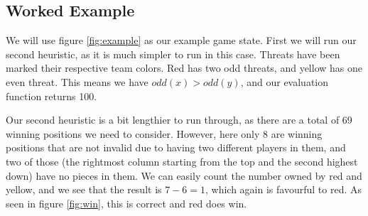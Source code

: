 \documentclass{article}
\begin{document}
\subsection{Worked Example}
We will use figure \ref{fig:example} as our example game state. First we will run our second heuristic, as it is much simpler to run in this case. Threats have been marked their respective team colors. Red has two odd threats, and yellow has one even threat. This means we have $odd(x) > odd(y)$, and our evaluation function returns 100.
	
Our second heuristic is a bit lengthier to run through, as there are a total of 69 winning positions we need to consider. However, here only 8 are winning positions that are not invalid due to having two different players in them, and two of those (the rightmost column starting from the top and the second highest down) have no pieces in them. We can easily count the number owned by red and yellow, and we see that the result is $7-6 = 1$, which again is favourful to red. As seen in figure \ref{fig:win}, this is correct and red does win.
\end{document}
